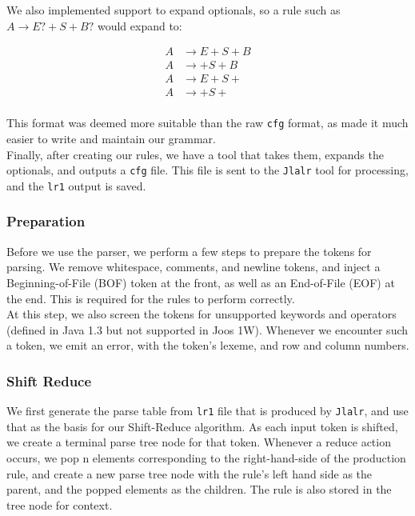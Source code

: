 \documentclass[12pt, a4paper]{article}
\begin{document}
We also implemented support to expand optionals, so a rule such as $A \rightarrow E? + S + B?$ would expand to:

\begin{align*}
A & \rightarrow E + S + B  \\
A & \rightarrow + S + B \\
A & \rightarrow E + S + \\
A & \rightarrow + S + \\
\end{align*}

This format was deemed more suitable than the raw \verb|cfg| format, as made it much easier to write and maintain our grammar. \\

Finally, after creating our rules, we have a tool that takes them, expands the optionals, and outputs a \verb|cfg| file. This file is sent to the \verb|Jlalr| tool for processing, and the \verb|lr1| output is saved. \\


\subsubsection{Preparation}
Before we use the parser, we perform a few steps to prepare the tokens for parsing. We remove whitespace, comments, and newline tokens, and inject a Beginning-of-File (BOF) token at the front, as well as an End-of-File (EOF) at the end. This is required for the rules to perform correctly. \\

At this step, we also screen the tokens for unsupported keywords and operators (defined in Java 1.3 but not supported in Joos 1W). Whenever we encounter such a token, we emit an error, with the token's lexeme, and row and column numbers.

\subsubsection{Shift Reduce}

We first generate the parse table from \verb|lr1| file that is produced by \verb|Jlalr|, and use that as the basis for our Shift-Reduce algorithm. As each input token is shifted, we create a terminal parse tree node for that token. Whenever a reduce action occurs, we pop n elements corresponding to the right-hand-side of the production rule, and create a new parse tree node with the rule's left hand side as the parent, and the popped elements as the children. The rule is also stored in the tree node for context. \\
\end{document}
